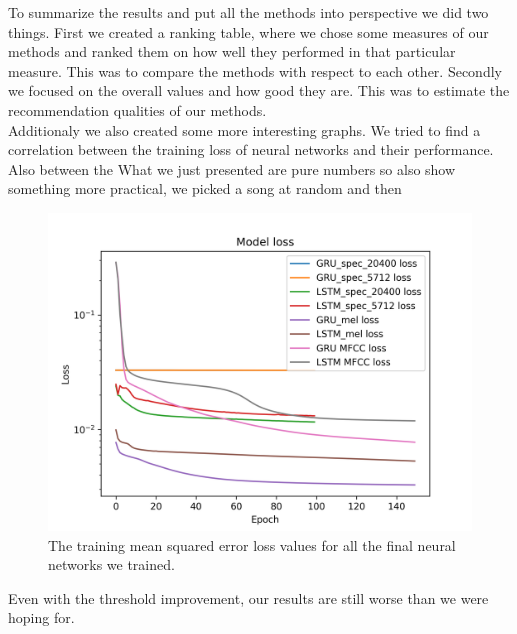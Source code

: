 To summarize the results and put all the methods into perspective we did two things. First we created a ranking table, where we chose some measures of our methods and ranked them on how well they performed in that particular measure. This was to compare the methods with respect to each other. Secondly we focused on the overall values and how good they are. This was to estimate the recommendation qualities of our methods.\\
Additionaly we also created some more interesting graphs. We tried to find a correlation between the training loss of neural networks and their performance. Also between the 
What we just presented are pure numbers so also show something more practical, we picked a song at random and then 
\begin{figure}[h]
    \centering
	\includegraphics[width=120mm]{./img/all_training_graphs.png}
	\caption{The training mean squared error loss values for all the final neural networks we trained.}
	\label{fig:all_model_training}
\end{figure}

Even with the threshold improvement, our results are still worse than we were hoping for. 

